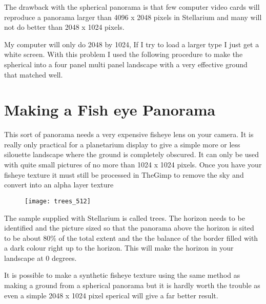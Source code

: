 The drawback with the spherical panorama is that few computer video
cards will reproduce a panorama larger than 4096 x 2048 pixels in
Stellarium and many will not do better than 2048 x 1024 pixels.

My computer will only do 2048 by 1024, If I try to load a larger type I
just get a white screen. With this problem I used the following
procedure to make the spherical into a four panel multi panel landscape
with a very effective ground that matched well.

\section{Making a Fish eye Panorama}
\label{making-a-fish-eye-panorama}

This sort of panorama needs a very expensive fisheye lens on your
camera. It is really only practical for a planetarium display to give a
simple more or less silouette landscape where the ground is completely
obscured. It can only be used with quite small pictures of no more than
1024 x 1024 pixels. Once you have your fisheye texture it must still be
processed in TheGimp to remove the sky and convert into an alpha layer
texture

\begin{figure}[h]
\centering\texttt{[image: trees\_512]}
\end{figure}

The sample supplied with Stellarium is called trees. The horizon needs
to be identified and the picture sized so that the panorama above the
horizon is sited to be about 80\% of the total extent and the the
balance of the border filled with a dark colour right up to the horizon.
This will make the horizon in your landscape at 0 degrees.

It is possible to make a synthetic fisheye texture using the same method
as making a ground from a spherical panorama but it is hardly worth the
trouble as even a simple 2048 x 1024 pixel sperical will give a far
better result.

